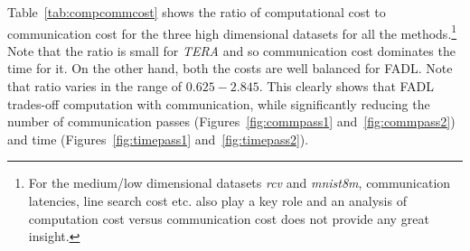 \documentclass[twoside, 11pt]{article}
\begin{document}
Table~\ref{tab:compcommcost} shows the ratio of computational cost to communication cost for the three high dimensional datasets for all the methods.\footnote{For the medium/low dimensional datasets {\it rcv} and {\it mnist8m}, communication latencies, line search cost etc. also play a key role and an analysis of computation cost versus communication cost does not provide any great insight.}
Note that the ratio is small for {\it TERA} and so communication cost dominates the time for it. On the other hand, both the costs are well balanced for FADL. Note that ratio varies in the range of $0.625-2.845$. This clearly shows that FADL trades-off computation with communication, while significantly reducing the number of communication passes (Figures~\ref{fig:commpass1} and~\ref{fig:commpass2}) and time (Figures~\ref{fig:timepass1} and~\ref{fig:timepass2}).




\end{document}
